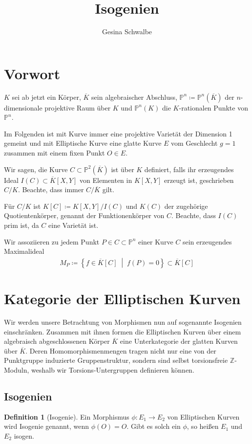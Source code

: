 \documentclass[english, german, parskip=half]{scrartcl}
\title{Isogenien}
\author{Gesina Schwalbe}
\theoremstyle{definition}
\newtheorem{Definition}[Satz]{Definition}
\theoremstyle{remark}
\newcommand*{\Z}{\mathds{Z}}
\newcommand*{\K}{\ensuremath{K}} %
\newcommand*{\algK}{\ensuremath{\overline K}} %
\renewcommand*{\P}{\ensuremath{\mathds{P}}} %
\renewcommand{\O}{O}
\begin{document}
\maketitle
\tableofcontents

\section{Vorwort}

$\K$ sei ab jetzt ein Körper, $\algK$ sein algebraischer Abschluss, 
$\P^n\coloneqq\P^n(\algK)$ der $n$-dimensionale projektive Raum über $\K$ und
$\P^n(\K)$ die $\K$-rationalen Punkte von $\P^n$.

Im Folgenden ist mit Kurve immer eine projektive Varietät der
Dimension 1 gemeint und mit Elliptische Kurve eine glatte Kurve $E$ vom
Geschlecht $g=1$ zusammen mit einem fixen Punkt $\O\in E$.

Wir sagen, die Kurve $C\subset\P^2(\algK)$ ist über $\K$ definiert,
falls ihr erzeugendes Ideal $I(C)\subset\algK[X,Y]$ von
Elementen in $\K[X,Y]$ erzeugt ist, geschrieben $C/\K$. Beachte, dass
immer $C/\algK$ gilt. 

Für $C/\K$ ist $\K[C]\coloneqq\K[X,Y]/I(C)$ 
und $\K(C)$ der zugehörige Quotientenkörper, genannt
der Funktionenkörper von $C$.
Beachte, dass $I(C)$ prim ist, da $C$ eine Varietät ist.

Wir assoziieren zu jedem Punkt $P\in C\subset\P^n$ einer Kurve $C$
sein erzeugendes Maximalideal 
\begin{gather*}
  M_P\coloneqq\left\{f\in\algK[C]\;\middle\vert\;f(P)=0\right\}
  \subset \algK[C]
\end{gather*}




\section{Kategorie der Elliptischen Kurven}
Wir werden unsere Betrachtung von Morphismen nun auf sogenannte
Isogenien einschränken. Zusammen mit ihnen formen die Elliptischen
Kurven über einem algebraisch abgeschlossenen Körper $\algK$ eine
Unterkategorie der glatten Kurven über $\algK$.
Deren Homomorphismenmengen tragen nicht nur eine von der Punktgruppe
induzierte Gruppenstruktur, sondern sind selbst torsionsfreie
$\Z$-Moduln, weshalb wir Torsions-Untergruppen definieren können.


\subsection{Isogenien}
\begin{Definition}[Isogenie]
  Ein Morphismus $\phi\colon E_1\to E_2$ von Elliptischen Kurven wird
  Isogenie genannt, wenn $\phi(\O)=\O$.
  Gibt es solch ein $\phi$, so heißen $E_1$ und $E_2$ isogen.
\end{Definition}
\end{document}
